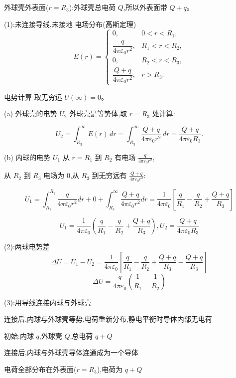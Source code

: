 \documentclass{article}
\begin{document}
外球壳外表面($ r = R_3 $):外球壳总电荷 $ Q $,所以外表面带 $ Q + q $。



 (1):未连接导线,未接地
 电场分布(高斯定理)
$$
E(r) =
\begin{cases}
0, & 0 < r < R_1, \\
\dfrac{q}{4\pi\varepsilon_0 r^2}, & R_1 < r < R_2, \\
0, & R_2 < r < R_3, \\
\dfrac{Q+q}{4\pi\varepsilon_0 r^2}, & r > R_3.
\end{cases}
$$



 电势计算
取无穷远 $ U(\infty) = 0 $。

(a) 外球壳的电势 $ U_2 $
外球壳是等势体,取 $ r = R_3 $ 处计算:

$$
U_2 = \int_{R_3}^{\infty} E(r) \, dr
= \int_{R_3}^{\infty} \frac{Q+q}{4\pi\varepsilon_0 r^2} \, dr
= \frac{Q+q}{4\pi\varepsilon_0 R_3}.
$$

(b) 内球的电势 $ U_1 $
从 $ r = R_1 $ 到 $ R_2 $ 有电场 $ \frac{q}{4\pi\varepsilon_0 r^2} $,

从 $ R_2 $ 到 $ R_3 $ 电场为 0,从 $ R_3 $ 到无穷远有 $ \frac{Q+q}{4\pi\varepsilon_0 r^2} $:

$$U_1 = \int_{R_1}^{R_2} \frac{q}{4\pi\varepsilon_0 r^2}dr+ 0 + \int_{R_3}^{\infty} \frac{Q+q}{4\pi\varepsilon_0 r^2} dr= \frac{1}{4\pi\varepsilon_0} \left[ \frac{q}{R_1} - \frac{q}{R_2} + \frac{Q+q}{R_3} \right]$$



$$\boxed{U_1 = \frac{1}{4\pi\varepsilon_0} \left( \frac{q}{R_1} - \frac{q}{R_2} + \frac{Q+q}{R_3} \right),U_2 = \frac{Q+q}{4\pi\varepsilon_0 R_3}}$$


\vspace{2em}
(2):两球电势差
$$\Delta U = U_1 - U_2= \frac{1}{4\pi\varepsilon_0} \left[ \frac{q}{R_1} - \frac{q}{R_2} + \frac{Q+q}{R_3} - \frac{Q+q}{R_3} \right]$$
$$\boxed{\Delta U = \frac{q}{4\pi\varepsilon_0} \left( \frac{1}{R_1} - \frac{1}{R_2} \right)}$$

\newpage



(3):用导线连接内球与外球壳

连接后,内球与外球壳等势,电荷重新分布,静电平衡时导体内部无电荷
 
初始:内球 $ q $,外球壳 $ Q $,总电荷 $ q+Q $ 

连接后,内球与外球壳导体连通成为一个导体

电荷全部分布在外表面($ r = R_3 $),电荷为 $ q+Q $
\end{document}
